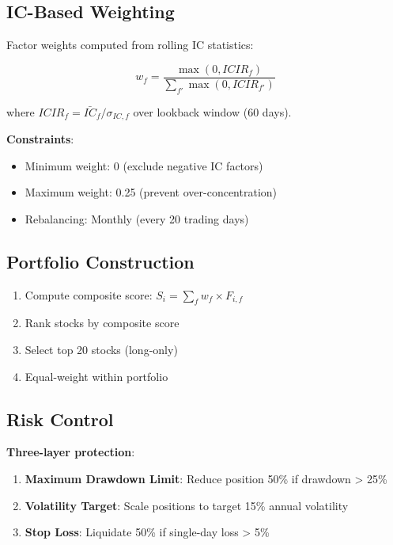\subsection{IC-Based Weighting}

Factor weights computed from rolling IC statistics:

\begin{equation}
w_f = \frac{\max(0, ICIR_f)}{\sum_{f'} \max(0, ICIR_{f'})}
\end{equation}

where $ICIR_f = \bar{IC}_f / \sigma_{IC,f}$ over lookback window (60 days).

\textbf{Constraints}:
\begin{itemize}
    \item Minimum weight: 0 (exclude negative IC factors)
    \item Maximum weight: 0.25 (prevent over-concentration)
    \item Rebalancing: Monthly (every 20 trading days)
\end{itemize}

\subsection{Portfolio Construction}

\begin{enumerate}
    \item Compute composite score: $S_i = \sum_f w_f \times F_{i,f}$
    \item Rank stocks by composite score
    \item Select top 20 stocks (long-only)
    \item Equal-weight within portfolio
\end{enumerate}

\subsection{Risk Control}

\textbf{Three-layer protection}:

\begin{enumerate}
    \item \textbf{Maximum Drawdown Limit}: Reduce position 50\% if drawdown > 25\%
    \item \textbf{Volatility Target}: Scale positions to target 15\% annual volatility
    \item \textbf{Stop Loss}: Liquidate 50\% if single-day loss > 5\%
\end{enumerate}

